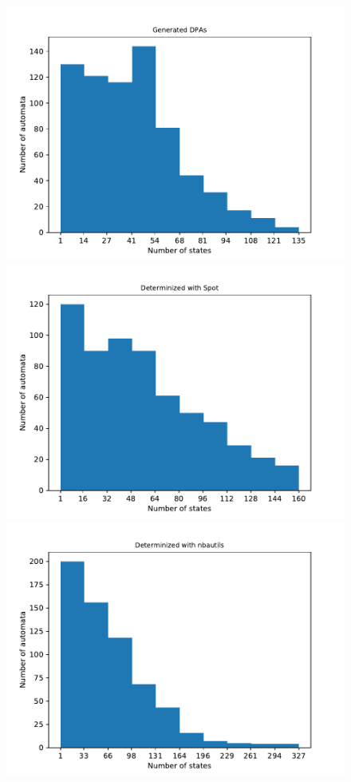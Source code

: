 \begin{figure}
	\centering
	\begin{minipage}{0.49\textwidth}
		\includegraphics[page=1,height=.3\textheight]{../data/analysis/rawstats_gendet.pdf} 
		\includegraphics[page=1,height=.3\textheight]{../data/analysis/rawstats_detspot.pdf} 
		\includegraphics[page=1,height=.3\textheight]{../data/analysis/rawstats_detnbaut.pdf}

\end{minipage}
\end{figure}
